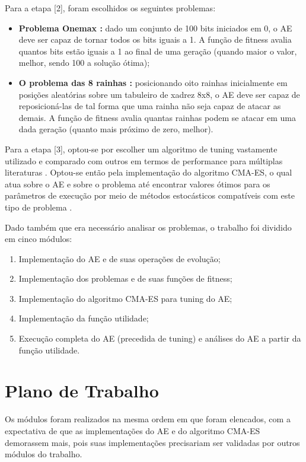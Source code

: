 Para a etapa [2], foram escolhidos os seguintes problemas:

\begin{itemize}

	\item \textbf{Problema Onemax \cite{giguere1998population}:} dado um conjunto de 100 bits iniciados em 0, o AE deve ser capaz de tornar todos os bits iguais a 1. A função de fitness avalia quantos bits estão iguais a 1 ao final de uma geração (quando maior o valor, melhor, sendo 100 a solução ótima);

	\item \textbf{O problema das 8 rainhas \cite{campbell1977gauss}:} posicionando oito rainhas inicialmente em posições aleatórias sobre um tabuleiro de xadrez 8x8, o AE deve ser capaz de reposicioná-las de tal forma que uma rainha não seja capaz de atacar as demais. A função de fitness avalia quantas rainhas podem se atacar em uma dada geração (quanto mais próximo de zero, melhor).

\end{itemize}

Para a etapa [3], optou-se por escolher um algoritmo de tuning vastamente utilizado e comparado com outros em termos de performance para múltiplas literaturas \cite{eiben2011parameter, smit2009comparing}. Optou-se então pela implementação do algoritmo CMA-ES, o qual atua sobre o AE e sobre o problema até encontrar valores ótimos para os parâmetros de execução por meio de métodos estocásticos compatíveis com este tipo de problema \cite{hansen2006cma}.

Dado também que era necessário analisar os problemas, o trabalho foi dividido em cinco módulos:

\begin{enumerate}
	\item Implementação do AE e de suas operações de evolução;
	\item Implementação dos problemas e de suas funções de fitness;
	\item Implementação do algoritmo CMA-ES para tuning do AE;
	\item Implementação da função utilidade;
	\item Execução completa do AE (precedida de tuning) e análises do AE a partir da função utilidade.
\end{enumerate}

\section{Plano de Trabalho}
\label{sec:plano_trabalho}

Os módulos foram realizados na mesma ordem em que foram elencados, com a expectativa de que as implementações do AE e do algoritmo CMA-ES demorassem mais, pois suas implementações precisariam ser validadas por outros módulos do trabalho.

%
